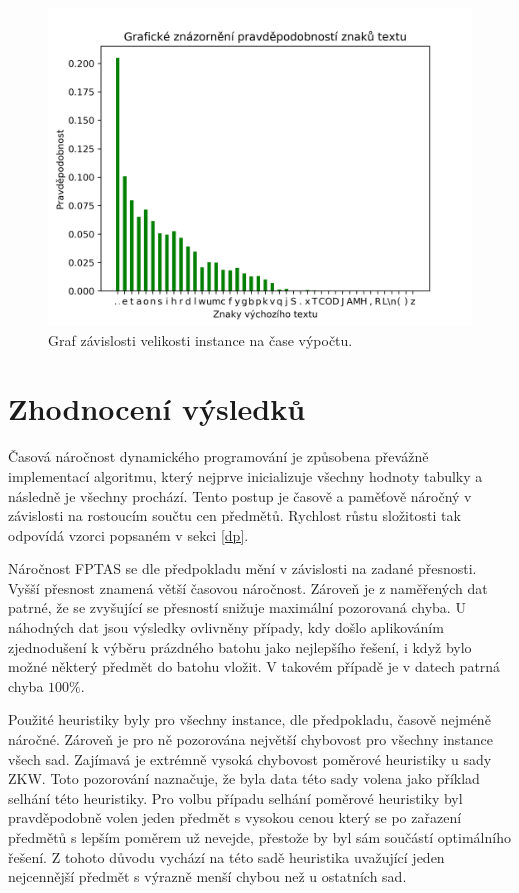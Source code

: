 \documentclass[12pt]{article}
\begin{document}
\begin{figure}[!htb]
\includegraphics[scale=0.7]{../011_char_prob.png}\centering\caption{Graf závislosti velikosti instance na čase výpočtu.}\label{ZKW_graph}
\end{figure}

   	\section{Zhodnocení výsledků}
		Časová náročnost dynamického programování je způsobena převážně implementací algoritmu, který nejprve inicializuje všechny hodnoty tabulky a následně je všechny prochází. Tento postup je časově a paměťově náročný v závislosti na rostoucím součtu cen předmětů. Rychlost růstu složitosti tak odpovídá vzorci popsaném v sekci \ref{dp}.
		
		Náročnost FPTAS se dle předpokladu mění v závislosti na zadané přesnosti. Vyšší přesnost znamená větší časovou náročnost. Zároveň je z naměřených dat patrné, že se zvyšující se přesností snižuje maximální pozorovaná chyba. U náhodných dat jsou výsledky ovlivněny případy, kdy došlo aplikováním zjednodušení k výběru prázdného batohu jako nejlepšího řešení, i když bylo možné některý předmět do batohu vložit. V takovém případě je v datech patrná chyba $100\%$.
		
		Použité heuristiky byly pro všechny instance, dle předpokladu, časově nejméně náročné. Zároveň je pro ně pozorována největší chybovost pro všechny instance všech sad. Zajímavá je extrémně vysoká chybovost poměrové heuristiky u sady ZKW. Toto pozorování naznačuje, že byla data této sady volena jako příklad selhání této heuristiky. Pro volbu případu selhání poměrové heuristiky byl pravděpodobně volen jeden předmět s vysokou cenou který se po zařazení předmětů s lepším poměrem už nevejde, přestože by byl sám součástí optimálního řešení. Z tohoto důvodu vychází na této sadě heuristika uvažující jeden nejcennější předmět s výrazně menší chybou než u ostatních sad.
		
 
\end{document}
